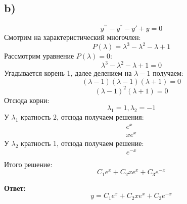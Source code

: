 \documentclass[a4paper, 12pt]{article}
\begin{document}
\subsection*{b)}
\[
y^{'''} - y^{''} - y' + y = 0
\]
Смотрим на характеристический многочлен:
\[
P(\lambda) = \lambda^3 - \lambda^2 -  \lambda + 1
\]
Рассмотрим уравнение $P(\lambda) = 0$:
\[
\lambda^3 - \lambda^2 -  \lambda + 1 = 0
\]
Угадывается корень 1, далее делением на $\lambda - 1$ получаем:
\[
 (\lambda - 1) (\lambda - 1)(\lambda + 1)= 0
\]
\[
(\lambda -1)^2 (\lambda + 1) = 0
\]
Отсюда корни:
\[
\lambda_1 = 1, \lambda_2 = -1
\]
У $\lambda_1$ кратность 2, отсюда получаем решения:
\[
      \begin{gathered} 
e^{x}  \\
x e^{x} 
      \end{gathered} 
\]
У $\lambda_2$ кратность 1, отсюда получаем решение:
\[
      \begin{gathered} 
e^{-x} \\
      \end{gathered} 
\]
Итого решение:
\[
C_1e^x + C_2 xe^x + C_3e^{-x}
\]
\begin{center}
\textbf{Ответ: } 
\[
y = C_1e^x + C_2 xe^x + C_3e^{-x}
\]
\end{center}
\clearpage
\end{document}
